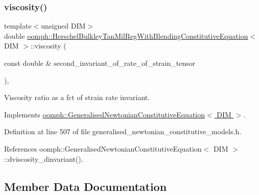 \subsubsection{\texorpdfstring{viscosity()}{viscosity()}}
{\footnotesize\ttfamily template$<$unsigned D\+IM$>$ \\
double \hyperlink{classoomph_1_1HerschelBulkleyTanMilRegWithBlendingConstitutiveEquation}{oomph\+::\+Herschel\+Bulkley\+Tan\+Mil\+Reg\+With\+Blending\+Constitutive\+Equation}$<$ D\+IM $>$\+::viscosity (\begin{DoxyParamCaption}\item[{const double \&}]{second\+\_\+invariant\+\_\+of\+\_\+rate\+\_\+of\+\_\+strain\+\_\+tensor }\end{DoxyParamCaption})\hspace{0.3cm}{\ttfamily [inline]}, {\ttfamily [virtual]}}



Viscosity ratio as a fct of strain rate invariant. 



Implements \hyperlink{classoomph_1_1GeneralisedNewtonianConstitutiveEquation_a3e6d811786e39ca3c3a9b1c46249442f}{oomph\+::\+Generalised\+Newtonian\+Constitutive\+Equation$<$ D\+I\+M $>$}.



Definition at line 507 of file generalised\+\_\+newtonian\+\_\+constitutive\+\_\+models.\+h.



References oomph\+::\+Generalised\+Newtonian\+Constitutive\+Equation$<$ D\+I\+M $>$\+::dviscosity\+\_\+dinvariant().



\subsection{Member Data Documentation}
\mbox{\label{classoomph_1_1HerschelBulkleyTanMilRegWithBlendingConstitutiveEquation_a2fcbea7454274274c607039540a3da49}} 
